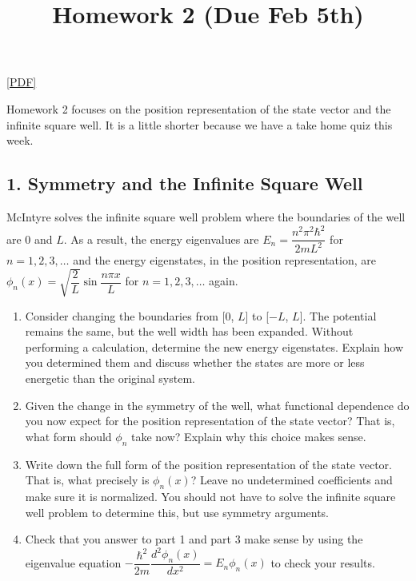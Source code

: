 \documentclass[
]{article}
\title{Homework 2 (Due Feb 5th)}
\author{}
\date{}
\providecommand{\tightlist}{%
  \setlength{\itemsep}{0pt}\setlength{\parskip}{0pt}}
\providecommand{\tightlist}{%
  \setlength{\itemsep}{0pt}\setlength{\parskip}{0pt}}
\begin{document}
\maketitle

\href{./homework2.pdf}{{[}PDF{]}}

Homework 2 focuses on the position representation of the state vector
and the infinite square well. It is a little shorter because we have a
take home quiz this week.

\hypertarget{symmetry-and-the-infinite-square-well}{%
\subsection{1. Symmetry and the Infinite Square
Well}\label{symmetry-and-the-infinite-square-well}}

McIntyre solves the infinite square well problem where the boundaries of
the well are 0 and \(L\). As a result, the energy eigenvalues are
\(E_n = \dfrac{n^2\pi^2\hbar^2}{2mL^2}\) for \(n = 1,2,3,\dots\) and the
energy eigenstates, in the position representation, are
\(\phi_n(x) = \sqrt{\dfrac{2}{L}} \sin \dfrac{n\pi x}{L}\) for
\(n = 1,2,3,\dots\) again.

\begin{enumerate}
\def\labelenumi{\arabic{enumi}.}
\tightlist
\item
  Consider changing the boundaries from {[}0, \(L\){]} to {[}\(-L\),
  \(L\){]}. The potential remains the same, but the well width has been
  expanded. Without performing a calculation, determine the new energy
  eigenstates. Explain how you determined them and discuss whether the
  states are more or less energetic than the original system.
\item
  Given the change in the symmetry of the well, what functional
  dependence do you now expect for the position representation of the
  state vector? That is, what form should \(\phi_n\) take now? Explain
  why this choice makes sense.
\item
  Write down the full form of the position representation of the state
  vector. That is, what precisely is \(\phi_n(x)\)? Leave no
  undetermined coefficients and make sure it is normalized. You should
  not have to solve the infinite square well problem to determine this,
  but use symmetry arguments.
\item
  Check that you answer to part 1 and part 3 make sense by using the
  eigenvalue equation
  \(-\dfrac{\hbar^2}{2m} \dfrac{d^2\phi_n(x)}{dx^2} = E_n \phi_n(x)\) to
  check your results.
\end{enumerate}
\end{document}
